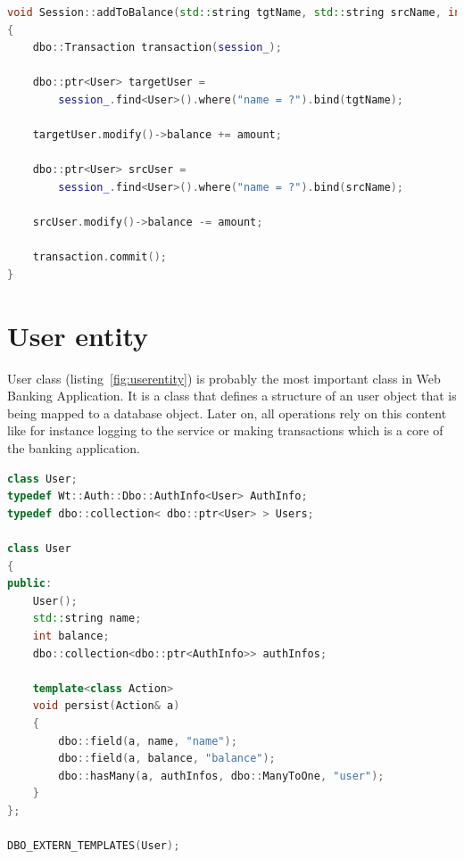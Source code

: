 \documentclass[a4paper,12pt]{book}
\newcommand\tab[1][1cm]{\hspace*{#1}}
\begin{document}
{\bigskip
\begin{lstlisting}[frame=single, label={fig:addtobalance}, basicstyle=\small, language=C++, caption={Session::addToBalance() method.}, captionpos=b]
void Session::addToBalance(std::string tgtName, std::string srcName, int amount)
{
	dbo::Transaction transaction(session_);

	dbo::ptr<User> targetUser = 
		session_.find<User>().where("name = ?").bind(tgtName);

	targetUser.modify()->balance += amount;

	dbo::ptr<User> srcUser = 
		session_.find<User>().where("name = ?").bind(srcName);

	srcUser.modify()->balance -= amount;

	transaction.commit();
}
\end{lstlisting}

}
\section{User entity}
{
\tab User class (listing~\ref{fig:userentity}) is probably the most important class in Web Banking Application. It is a class that defines a structure of an user object that is being mapped to a database object. Later on, all operations rely on this content like for instance logging to the service or making transactions which is a core of the banking application.

\bigskip
\begin{lstlisting}[frame=single, label={fig:userentity}, basicstyle=\small, language=C++, caption={User class.}, captionpos=b]
class User;
typedef Wt::Auth::Dbo::AuthInfo<User> AuthInfo;
typedef dbo::collection< dbo::ptr<User> > Users;

class User
{
public:
	User();
    std::string name;
    int balance;
    dbo::collection<dbo::ptr<AuthInfo>> authInfos;

    template<class Action>
    void persist(Action& a)
    {
        dbo::field(a, name, "name");
        dbo::field(a, balance, "balance");
        dbo::hasMany(a, authInfos, dbo::ManyToOne, "user");
    }
};

DBO_EXTERN_TEMPLATES(User);
\end{lstlisting}
}
\end{document}
